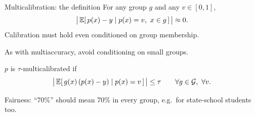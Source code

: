 
\begin{frame}{Multicalibration: the definition}
  For any group $g$ and any $v \in [0,1]$,
  \[
    \big|\,\mathbb{E}[\,p(x) - y \mid p(x) = v,\ x \in g\,]\,\big| \approx 0 .
  \]
  Calibration must hold even conditioned on group membership.

  \vspace{0.5em}
  As with multiaccuracy, avoid conditioning on small groups.

  $p$ is \alert{$\tau$-multicalibrated} if
  \[
    \big|\,\mathbb{E}[\,g(x)\,(p(x) - y) \mid p(x) = v\,]\,\big| \le \tau
    \qquad \forall g \in \mathcal{G},\ \forall v .
  \]

  \pause
  \vspace{1em}
  \alert{Fairness:} ``70\%'' should mean 70\% in every group,
  e.g.\ for state-school students too.
\end{frame}
